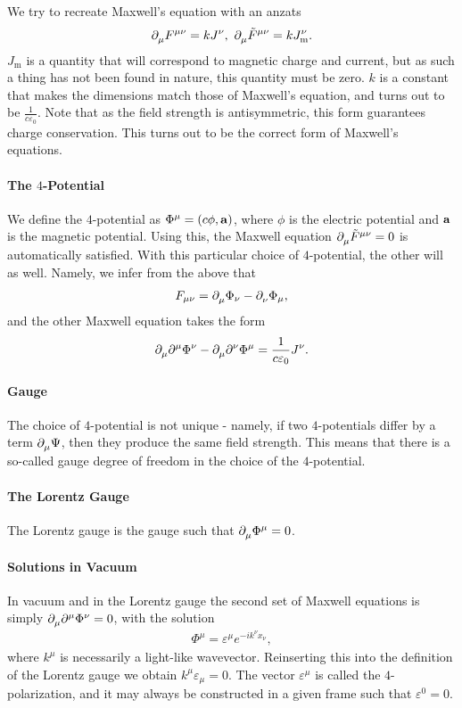 We try to recreate Maxwell's equation with an anzats
\begin{align*}
	\del{\mu}{F^{\mu\nu}} = kJ^{\nu},\ \del{\mu}{\tilde{F}^{\mu\nu}} = kJ_{\text{m}}^{\nu}.
\end{align*}
$J_{\text{m}}$ is a quantity that will correspond to magnetic charge and current, but as such a thing has not been found in nature, this quantity must be zero. $k$ is a constant that makes the dimensions match those of Maxwell's equation, and turns out to be $\frac{1}{c\varepsilon_{0}}$. Note that as the field strength is antisymmetric, this form guarantees charge conservation. This turns out to be the correct form of Maxwell's equations.

\paragraph{The $4$-Potential}
We define the $4$-potential as $\Phi^{\mu} = (c\phi, \vb{a})$, where $\phi$ is the electric potential and $\vb{a}$ is the magnetic potential. Using this, the Maxwell equation $\del{\mu}{\tilde{F}^{\mu\nu}} = 0$ is automatically satisfied. With this particular choice of $4$-potential, the other will as well. Namely, we infer from the above that 
\begin{align*}
	F_{\mu\nu} = \del{\mu}{\Phi_{\nu}} - \del{\nu}{\Phi_{\mu}},
\end{align*}
and the other Maxwell equation takes the form
\begin{align*}
	\del{\mu}{\del[\mu]{}{\Phi^{\nu}}} - \del{\mu}{\del[\nu]{}{\Phi^{\mu}}} = \frac{1}{c\varepsilon_{0}}J^{\nu}.
\end{align*}

\paragraph{Gauge}
The choice of $4$-potential is not unique - namely, if two $4$-potentials differ by a term $\del{\mu}{\Psi}$, then they produce the same field strength. This means that there is a so-called gauge degree of freedom in the choice of the $4$-potential.

\paragraph{The Lorentz Gauge}
The Lorentz gauge is the gauge such that $\del{\mu}{\Phi^{\mu}} = 0$.

\paragraph{Solutions in Vacuum}
In vacuum and in the Lorentz gauge the second set of Maxwell equations is simply $\del{\mu}{\del[\mu]{}{\Phi^{\nu}}} = 0$, with the solution
\begin{align*}
	\Phi^{\mu} = \varepsilon^{\mu}e^{-ik^{\nu}x_{\nu}},
\end{align*}
where $k^{\mu}$ is necessarily a light-like wavevector. Reinserting this into the definition of the Lorentz gauge we obtain $k^{\mu}\varepsilon_{\mu} = 0$. The vector $\varepsilon^{\mu}$ is called the $4$-polarization, and it may always be constructed in a given frame such that $\varepsilon^{0} = 0$.

